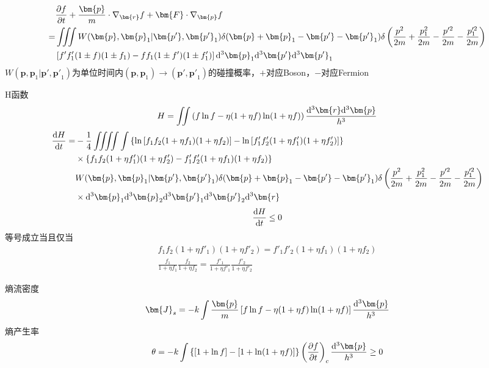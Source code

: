 \begin{align*}
    & \pt{f}{t} + \frac{\bm{p}}{m} \cdot \nabla_{\bm{r}} f + \bm{F} \cdot \nabla_{\bm{p}} f 
    \\
    = &\iiint W(\bm{p}, \bm{p}_1 | \bm{p'}, \bm{p'}_1) \delta(\bm{p} + \bm{p}_1 - \bm{p'} - \bm{p'}_1) \delta\left(\frac{p^2}{2m} + \frac{p_1^2}{2m} - \frac{p'^2}{2m} - \frac{p_1'^2}{2m}\right)
    \\
    &\left[f' f_1' (1 \pm f)(1 \pm f_1) - f f_1 (1 \pm f')(1 \pm f_1')\right] \d^3 \bm{p}_1 \d^3 \bm{p'} \d^3 \bm{p'}_1
\end{align*}
$W(\bm{p}, \bm{p}_1 | \bm{p'}, \bm{p'}_1)$为单位时间内$(\bm{p}, \bm{p}_1) \to (\bm{p'}, \bm{p'}_1)$的碰撞概率，$+$对应Boson，$-$对应Fermion

H函数
\begin{gather*}
    H = \iint \left(f \ln f - \eta (1+\eta f) \ln(1+\eta f)\right) \frac{\d^3 \bm{r} \d^3 \bm{p}}{h^3}
\end{gather*}
\begin{align*}
    \dt{H}{t} =& -\frac{1}{4} \iiiint \int \left\{\ln\left[f_1 f_2 (1+\eta f_1)(1+\eta f_2)\right]-\ln\left[f'_1 f'_2 (1+\eta f'_1)(1+\eta f'_2)\right]\right\}
    \\
    & \times \left\{f_1 f_2 (1+\eta f'_1)(1+\eta f'_2)-f'_1 f'_2 (1+\eta f_1)(1+\eta f_2)\right\}
    \\
    &W(\bm{p}, \bm{p}_1 | \bm{p'}, \bm{p'}_1) \delta(\bm{p} + \bm{p}_1 - \bm{p'} - \bm{p'}_1) \delta\left(\frac{p^2}{2m} + \frac{p_1^2}{2m} - \frac{p'^2}{2m} - \frac{p_1'^2}{2m}\right)
    \\
    & \times \d^3 \bm{p}_1 \d^3 \bm{p}_2 \d^3 \bm{p'}_1 \d^3 \bm{p'}_2 \d^3 \bm{r}
\end{align*}
\begin{gather*}
    \frac{\mathrm{d} H}{\mathrm{d} t} \leq 0
\end{gather*}
等号成立当且仅当
\begin{gather*}
    f_1 f_2 (1+\eta f'_1)(1+\eta f'_2) = f'_1 f'_2 (1+\eta f_1)(1+\eta f_2)
    \\
    \frac{f_1}{1+\eta f_1} \frac{f_2}{1+\eta f_2} = \frac{f'_1}{1+\eta f'_1} \frac{f'_2}{1+\eta f'_2}
\end{gather*}

熵流密度
\begin{gather*}
    \bm{J}_s = -k \int \frac{\bm{p}}{m} \left[f \ln f - \eta (1+\eta f) \ln(1+\eta f)\right] \frac{\d^3 \bm{p}}{h^3}
\end{gather*}
熵产生率
\begin{gather*}
    \theta = -k\int \left\{\left[1+\ln f\right]-\left[1+\ln(1+\eta f)\right]\right\} \left(\pt{f}{t}\right)_c \frac{\d^3 \bm{p}}{h^3} \geq 0
\end{gather*}

